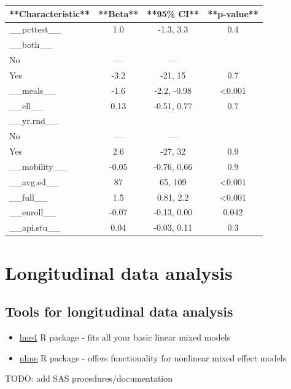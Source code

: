 \documentclass[
]{book}
\begin{document}
\begin{tabular}{l|c|c|c}
\hline
**Characteristic** & **Beta** & **95\% CI** & **p-value**\\
\hline
\_\_pcttest\_\_ & 1.0 & -1.3, 3.3 & 0.4\\
\hline
\_\_both\_\_ &  &  & \\
\hline
No & — & — & \\
\hline
Yes & -3.2 & -21, 15 & 0.7\\
\hline
\_\_meals\_\_ & -1.6 & -2.2, -0.98 & <0.001\\
\hline
\_\_ell\_\_ & 0.13 & -0.51, 0.77 & 0.7\\
\hline
\_\_yr.rnd\_\_ &  &  & \\
\hline
No & — & — & \\
\hline
Yes & 2.6 & -27, 32 & 0.9\\
\hline
\_\_mobility\_\_ & -0.05 & -0.76, 0.66 & 0.9\\
\hline
\_\_avg.ed\_\_ & 87 & 65, 109 & <0.001\\
\hline
\_\_full\_\_ & 1.5 & 0.81, 2.2 & <0.001\\
\hline
\_\_enroll\_\_ & -0.07 & -0.13, 0.00 & 0.042\\
\hline
\_\_api.stu\_\_ & 0.04 & -0.03, 0.11 & 0.3\\
\hline
\end{tabular}

\hypertarget{longitudinal-data-analysis}{%
\chapter{Longitudinal data analysis}\label{longitudinal-data-analysis}}

\hypertarget{tools-for-longitudinal-data-analysis}{%
\section{Tools for longitudinal data analysis}\label{tools-for-longitudinal-data-analysis}}

\begin{itemize}
\item
  \href{https://cran.r-project.org/web/packages/lme4/index.html}{lme4} R package - fits all your basic linear mixed models
\item
  \href{https://cran.r-project.org/web/packages/nlme/index.html}{nlme} R package - offers functionality for nonlinear mixed effect models
\end{itemize}

TODO: add SAS procedures/documentation
\end{document}
